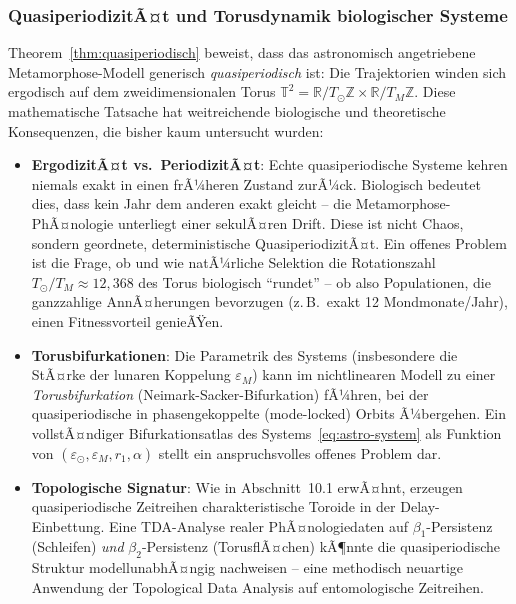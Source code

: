 ﻿\documentclass[12pt, a4paper]{article}
\theoremstyle{definition}
\newcommand{\R}{\mathbb{R}}
\newcommand{\Z}{\mathbb{Z}}
\begin{document}
\subsubsection{QuasiperiodizitÃ¤t und Torusdynamik biologischer Systeme}

Theorem~\ref{thm:quasiperiodisch} beweist, dass das astronomisch angetriebene
Metamorphose-Modell generisch \emph{quasiperiodisch} ist: Die Trajektorien winden
sich ergodisch auf dem zweidimensionalen Torus $\mathbb{T}^2 = \R/T_{\odot}\Z
\times \R/T_M\Z$. Diese mathematische Tatsache hat weitreichende biologische
und theoretische Konsequenzen, die bisher kaum untersucht wurden:

\begin{itemize}
  \item \textbf{ErgodizitÃ¤t vs.\ PeriodizitÃ¤t}: Echte quasiperiodische Systeme
        kehren niemals exakt in einen frÃ¼heren Zustand zurÃ¼ck. Biologisch bedeutet
        dies, dass kein Jahr dem anderen exakt gleicht -- die Metamorphose-PhÃ¤nologie
        unterliegt einer sekulÃ¤ren Drift. Diese ist nicht Chaos, sondern geordnete,
        deterministische QuasiperiodizitÃ¤t. Ein offenes Problem ist die Frage, ob
        und wie natÃ¼rliche Selektion die Rotationszahl $T_{\odot}/T_M \approx 12{,}368$
        des Torus biologisch ``rundet'' -- ob also Populationen, die ganzzahlige
        AnnÃ¤herungen bevorzugen (z.\,B.\ exakt 12 Mondmonate/Jahr), einen
        Fitnessvorteil genieÃŸen.

  \item \textbf{Torusbifurkationen}: Die Parametrik des Systems
        (insbesondere die StÃ¤rke der lunaren Koppelung $\varepsilon_M$)
        kann im nichtlinearen Modell zu einer \emph{Torusbifurkation}
        (Neimark-Sacker-Bifurkation) fÃ¼hren, bei der quasiperiodische in
        phasengekoppelte (mode-locked) Orbits Ã¼bergehen. Ein vollstÃ¤ndiger
        Bifurkationsatlas des Systems~\eqref{eq:astro-system} als Funktion von
        $(\varepsilon_{\odot}, \varepsilon_M, r_1, \alpha)$ stellt ein
        anspruchsvolles offenes Problem dar.

  \item \textbf{Topologische Signatur}: Wie in Abschnitt~10.1 erwÃ¤hnt, erzeugen
        quasiperiodische Zeitreihen charakteristische Toroide in der
        Delay-Einbettung. Eine TDA-Analyse realer PhÃ¤nologiedaten auf
        $\beta_1$-Persistenz (Schleifen) \emph{und} $\beta_2$-Persistenz
        (TorusflÃ¤chen) kÃ¶nnte die quasiperiodische Struktur modellunabhÃ¤ngig
        nachweisen -- eine methodisch neuartige Anwendung der Topological
        Data Analysis auf entomologische Zeitreihen.
\end{itemize}
\end{document}
